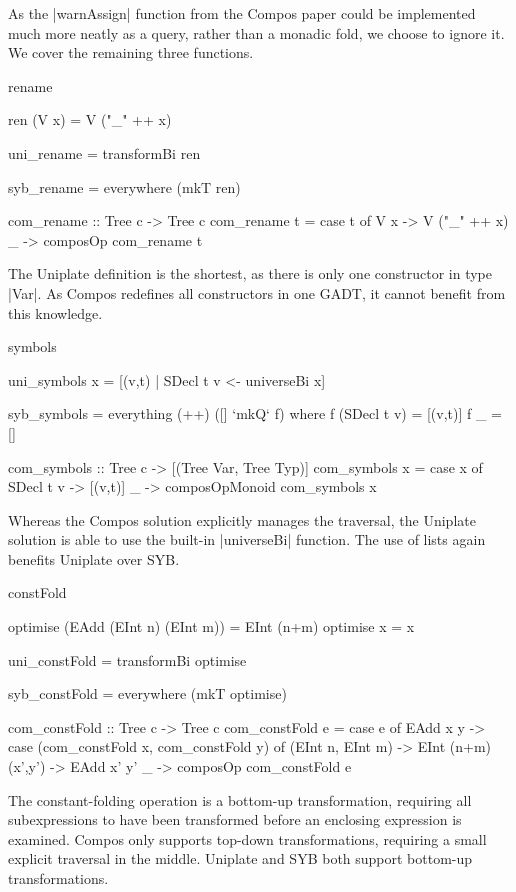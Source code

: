 As the |warnAssign| function from the Compos paper could be implemented much more neatly as a query, rather than a monadic fold, we choose to ignore it. We cover the remaining three functions.

\begin{examplename}{rename}

\ignore\begin{code}
ren (V x) = V ("_" ++ x)

uni_rename = transformBi ren

syb_rename = everywhere (mkT ren)

com_rename :: Tree c -> Tree c
com_rename t = case t of
    V x -> V ("_" ++ x)
    _   -> composOp com_rename t
\end{code}

The Uniplate definition is the shortest, as there is only one constructor in type |Var|. As Compos redefines all constructors in one GADT, it cannot benefit from this knowledge.
\end{examplename}

\begin{examplename}{symbols}

\ignore\begin{code}
uni_symbols x = [(v,t) | SDecl t v <- universeBi x]
\end{code}
\ignore\begin{code}
syb_symbols = everything (++) ([] `mkQ` f)
    where  f (SDecl t v)  = [(v,t)]
           f _            = []

com_symbols :: Tree c -> [(Tree Var, Tree Typ)]
com_symbols x = case x of
    SDecl t v -> [(v,t)]
    _ -> composOpMonoid com_symbols x
\end{code}

Whereas the Compos solution explicitly manages the traversal, the Uniplate solution is able to use the built-in |universeBi| function. The use of lists again benefits Uniplate over SYB.
\end{examplename}

\begin{examplename}{constFold}

\ignore\begin{code}
optimise (EAdd (EInt n) (EInt m)) = EInt (n+m)
optimise x = x

uni_constFold = transformBi optimise

syb_constFold = everywhere (mkT optimise)

com_constFold :: Tree c -> Tree c
com_constFold e = case e of
    EAdd x y -> case  (com_constFold x, com_constFold y) of
                      (EInt n, EInt m) -> EInt (n+m)
                      (x',y') -> EAdd x' y'
    _ -> composOp com_constFold e
\end{code}

The constant-folding operation is a bottom-up transformation, requiring all subexpressions to have been transformed before an enclosing expression is examined. Compos only supports top-down transformations, requiring a small explicit traversal in the middle. Uniplate and SYB both support bottom-up transformations.
\end{examplename}

